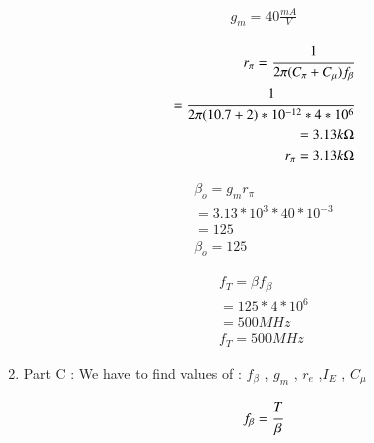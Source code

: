 \begin{enumerate}[label=\thesubsection.\arabic*.,ref=\thesubsection.\theenumi]
\begin{align}
        
    g_{m}= 40 \frac{mA}{V}

\end{align}

\begin{align}
    
    r_{\pi} = \cfrac{1}{2\pi(C_{\pi}+C_{\mu})f_{\beta}}\\
      
            = \cfrac{1}{2\pi(10.7+2)*{10^{-12}}*4*10^6}\\
              
            = 3.13 k\ohm\\
              
              
        
    r_{\pi} = 3.13 k\ohm
        
    
\end{align}        
    
\begin{align}
     
    \beta_{o} = g_{m}r_{\pi}\\
      
              = 3.13*{10^3}*40*10^{-3}\\
              
              = 125 \\
        
    
    \beta_{o} = 125 
        
\end{align}        
 
\begin{align}
 
    f_{T} = \beta f_{\beta}\\
          
          = 125 * 4 * 10^6\\
             
          = 500 MHz\\

    f_{T} = 500 MHz  
     
\end{align}       

\item
Part C : We have to find values of :
 $f_{\beta}$ , $g_{m}$ , $r_{e}$ ,$I_{E}$ , $C_{\mu}$\\
 
\solution

\begin{align}

     f_{\beta} = \cfrac{{T}}{\beta} \\
               

\end{align}
\end{enumerate}
